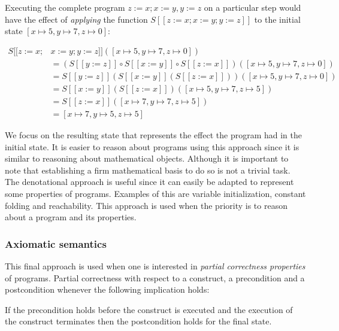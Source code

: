 Executing the complete program $z:=x; x:=y, y:=z$ on a particular step would have the effect of \textit{applying} the function $S [\![ z:=x; x:=y; y:=z ]\!]$ to the initial state $[x\mapsto5, y\mapsto7, z\mapsto0]$:

\begin{align*}
S [\![ z:=x; & x:=y; y:=z ]\!]([x\mapsto5, y\mapsto7, z\mapsto0])\\
&= (S [\![ y:=z ]\!] \circ S [\![ x:=y ]\!] \circ S [\![ z:=x ]\!])([x\mapsto5, y\mapsto7, z\mapsto0])\\
&= S [\![ y:=z ]\!](S [\![ x:=y ]\!] (S [\![ z:=x ]\!]))([x\mapsto5, y\mapsto7, z\mapsto0])\\
&= S [\![ x:=y ]\!] (S [\![ z:=x ]\!])([x\mapsto5, y\mapsto7, z\mapsto5])\\
&= S [\![ z:=x ]\!]([x\mapsto7, y\mapsto7, z\mapsto5])\\
&= [x\mapsto7, y\mapsto5, z\mapsto5]
\end{align*}

We focus on the resulting state that represents the effect the program had in the initial state.
It is easier to reason about programs using this approach since it is similar to reasoning about mathematical objects.
Although it is important to note that establishing a firm mathematical basis to do so is not a trivial task.
The denotational approach is useful since it can easily be adapted to represent some properties of programs.
Examples of this are variable initialization, constant folding and reachability.
This approach is used when the priority is to reason about a program and its properties.~\parencite{nielson}

\begin{comment}
what the program does opposed to how it does it. Modifying mathematical objects.
\end{comment}

\subsubsection{Axiomatic semantics}

This final approach is used when one is interested in \textit{partial correctness properties} of programs.
Partial correctness with respect to a construct, a precondition and a postcondition whenever the following implication holds:

\begin{displayquote}
If the precondition holds before the construct is executed and the execution of the construct terminates then the postcondition holds for the final state.
\end{displayquote}

